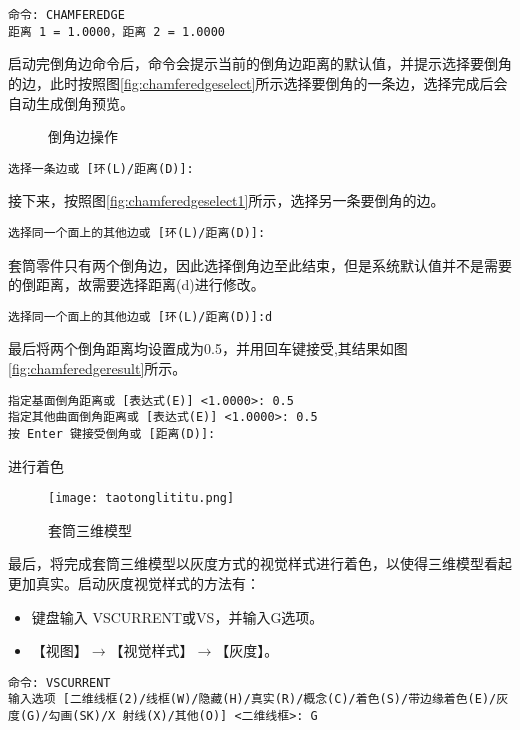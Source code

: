 \begin{procedure}
\begin{lstlisting}
命令: CHAMFEREDGE
距离 1 = 1.0000，距离 2 = 1.0000
\end{lstlisting}

启动完倒角边命令后，命令会提示当前的倒角边距离的默认值，并提示选择要倒角的边，此时按照图\ref{fig:chamferedgeselect}所示选择要倒角的一条边，选择完成后会自动生成倒角预览。
\begin{figure}[htbp]
\centering
{}\hspace{20pt}
\hspace{20pt}
\caption{倒角边操作}
\end{figure}
\begin{lstlisting}
选择一条边或 [环(L)/距离(D)]:
\end{lstlisting}

接下来，按照图\ref{fig:chamferedgeselect1}所示，选择另一条要倒角的边。
\begin{lstlisting}
选择同一个面上的其他边或 [环(L)/距离(D)]:
\end{lstlisting}

套筒零件只有两个倒角边，因此选择倒角边至此结束，但是系统默认值并不是需要的倒距离，故需要选择距离(d)进行修改。
\begin{lstlisting}
选择同一个面上的其他边或 [环(L)/距离(D)]:d
\end{lstlisting}

最后将两个倒角距离均设置成为0.5，并用回车键接受,其结果如图\ref{fig:chamferedgeresult}所示。
\begin{lstlisting}
指定基面倒角距离或 [表达式(E)] <1.0000>: 0.5
指定其他曲面倒角距离或 [表达式(E)] <1.0000>: 0.5
按 Enter 键接受倒角或 [距离(D)]:
\end{lstlisting}
\item 进行着色
\begin{figure}[htbp]
\centering
\texttt{[image: taotonglititu.png]}
\caption{套筒三维模型}\label{fig:taotonglititu}
\end{figure}

最后，将完成套筒三维模型以灰度方式的视觉样式进行着色，以使得三维模型看起更加真实。启动灰度视觉样式的方法有：
\begin{itemize}
\item 键盘输入 VSCURRENT或VS，并输入G选项。
\item 【视图】$\rightarrow$【视觉样式】$\rightarrow$【灰度】。
\end{itemize}
\begin{lstlisting}
命令: VSCURRENT
输入选项 [二维线框(2)/线框(W)/隐藏(H)/真实(R)/概念(C)/着色(S)/带边缘着色(E)/灰度(G)/勾画(SK)/X 射线(X)/其他(O)] <二维线框>: G
\end{lstlisting}


\end{procedure}
